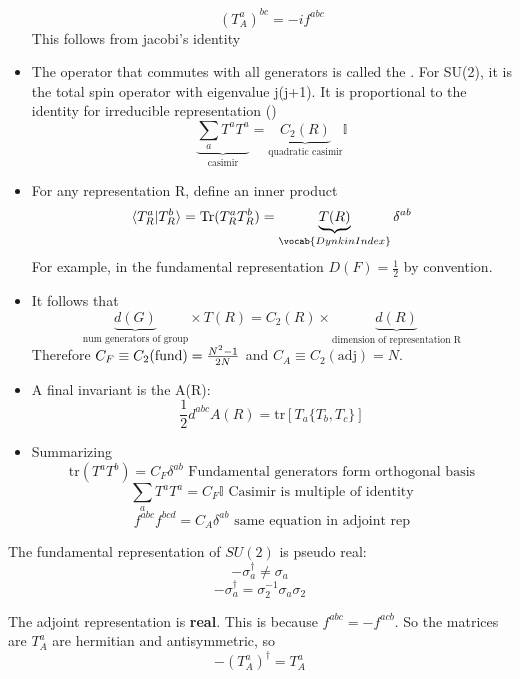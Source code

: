 \documentclass[11pt]{scrartcl}
\begin{document}
\begin{itemize}
	\[ (T_A^a)^{bc} = -i f^{abc} \] 
	This follows from jacobi's identity
	\item The operator that commutes with all generators is called the .  For SU(2), it is the total spin operator with eigenvalue j(j+1).  It is proportional to the identity for irreducible representation ()
	\[\underbrace{ \sum_a T^a T^a}_{\text{casimir}} = \underbrace{C_2(R)}_{\text{quadratic casimir}} \mathbb{I} \]
	\item For any representation R, define an inner product
	\[ \braket{T_R^a | T_R^b} = \mathrm{Tr}(T_R^a T_R^b) = \underbrace{T(R)}_{\vocab{Dynkin Index}} \delta^{ab} \]	
	For example, in the fundamental representation $D(F) = \frac12$ by convention.
	\item It follows that \[ \underbrace{d(G)}_{\text{num generators of group}} \times T(R) = C_2(R) \times \underbrace{d(R)}_{\text{dimension of representation R}}\]
	Therefore $C_F \equiv C_2(\mathrm{fund}) = {N^2 -1 \over 2N}$ and $C_A \equiv C_2(\mathrm{adj}) = N$.
	\item A final invariant is the  A(R):
	\[ \frac12 d^{abc} A(R) = \mathrm{tr}[T_a \{ T_b, T_c \}] \]
	\item Summarizing
	\[\mathrm{tr} (T^a T^b) = C_F \delta^{ab} \text{ Fundamental
	generators form orthogonal basis} \]
	\[ \sum_a T^{a} T^a = C_F \mathbb{I}  \text{  Casimir is multiple of identity} \]
	\[f^{abc} f^{bcd} = C_A \delta^{ab} \text{  same equation in adjoint rep} \]
	
\end{itemize}

\begin{example}
	The fundamental representation of $SU(2)$ is pseudo real:
	\[-\sigma_a^\dagger \neq \sigma_a\]
	\[- \sigma_a^{\dagger} = \sigma_2^{-1} \sigma_{a} \sigma_2\]
\end{example}

\begin{example}
	The adjoint representation is \textbf{real}.  This is because 
	$f^{abc} = - f^{acb}$. So the matrices are $T_A^a$ are hermitian and antisymmetric, so 
	\[ -(T_A^a)^\dagger = T_A^a \]
\end{example}
\end{document}
